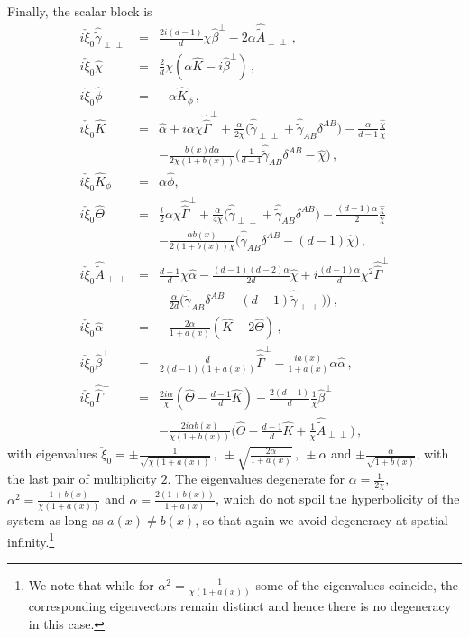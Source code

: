\documentclass[reprint,aps,amsmath,amssymb,twoside,prd,showkeys,superscriptaddress,nofootinbib]{revtex4-2}
\begin{document}
Finally, the scalar block is
\begin{subequations}\label{hyp_scalar}
\begin{eqnarray}
i\check{\xi}_0\hat{\tilde{\gamma}}_{\perp\perp} &=& \tfrac{2i(d-1)}{d}\chi\hat{\beta}^{\perp} - 2\alpha\hat{\tilde{A}}_{\perp\perp}\,,\\
i\check{\xi}_0\hat{\chi} &=& \tfrac{2}{d}\chi(\alpha\hat{K} - i\hat{\beta}^{\perp} )\,, \\
i\check{\xi}_0\hat{\phi} &=& -\alpha\hat{K}_{\phi}\,,\\
i\check{\xi}_0\hat{K} &=& \hat{\alpha}+i\alpha\chi\hat{\hat{\Gamma}}^{\perp}+\tfrac{\alpha}{2\chi}\big(\hat{\tilde{\gamma}}_{\perp\perp}+\hat{\tilde{\gamma}}_{AB}\delta^{AB}\big)-\tfrac{\alpha}{d-1}\tfrac{\hat{\chi}}{\chi}\nonumber\\&&-\tfrac{b(x)d\alpha}{2\chi(1+b(x))}\big(\tfrac{1}{d-1}\hat{\tilde{\gamma}}_{AB}\delta^{AB}-\hat{\chi}\big)\,, \\
i\check{\xi}_0\hat{K}_{\phi} &=& \alpha\hat{\phi}, \\
i\check{\xi}_0\hat{\Theta} &=& \tfrac{i}{2}\alpha\chi\hat{\hat{\Gamma}}^{\perp} +\tfrac{\alpha}{4\chi}\big(\hat{\tilde{\gamma}}_{\perp\perp}+\hat{\tilde{\gamma}}_{AB}\delta^{AB}\big)- \tfrac{(d-1)\alpha}{2}\tfrac{\hat{\chi}}{\chi}\nonumber\\&&-\tfrac{\alpha b(x)}{2(1+b(x))\chi}\big(\hat{\tilde{\gamma}}_{AB}\delta^{AB}-(d-1)\hat{\chi}\big)\,,\\
i\check{\xi}_0\hat{\tilde{A}}_{\perp\perp}&=&\tfrac{d-1}{d}\chi\hat{\alpha} - \tfrac{(d-1)(d-2)\alpha}{2d}\hat{\chi}+i\tfrac{(d-1)\alpha}{d}\chi^2\hat{\hat{\Gamma}}^{\perp}\nonumber\\&&  - \tfrac{\alpha}{2d}\big(\hat{\tilde{\gamma}}_{AB}\delta^{AB}-(d-1)\hat{\tilde{\gamma}}_{\perp\perp})\big)\,,\\
i\check{\xi}_0\hat{\alpha} &=& -\tfrac{2\alpha}{1+a(x)} (\hat{K}-2\hat{\Theta})\,,\\
i\check{\xi}_0\hat{\beta}^{\perp}&=&\tfrac{d}{2(d-1)(1+a(x))}\hat{\hat{\Gamma}}^{\perp}-\tfrac{ia(x)}{1+a(x)}\alpha \hat{\alpha}\,,\\
i\check{\xi}_0\hat{\hat{\Gamma}}^{\perp} &=& \tfrac{2i\alpha}{\chi}\left(\hat{\Theta}-\tfrac{d-1}{d}\hat{K}\right)-\tfrac{2(d-1)}{d}\tfrac{1}{\chi}\hat{\beta}^{\perp}\nonumber\\&& -\tfrac{2i\alpha b(x)}{\chi(1+b(x))}\big(\hat{\Theta}-\tfrac{d-1}{d}\hat{K}+\tfrac{1}{\chi}\hat{\tilde{A}}_{\perp\perp}\big)\,,
\end{eqnarray}
\end{subequations}
with eigenvalues $\check{\xi}_0 = \pm\tfrac{1}{\sqrt{\chi(1+a(x))}}\,,~\pm\sqrt{\tfrac{2\alpha}{1+a(x)}}\,,~\pm\alpha$ and $\pm\tfrac{\alpha}{\sqrt{1+b(x)}}$, with the last pair of multiplicity $2$. The eigenvalues degenerate for $\alpha=\frac{1}{2\chi}$, $\alpha^2=\frac{1+b(x)}{\chi(1+a(x))}$ and $\alpha=\frac{2(1+b(x))}{1+a(x)}$,  which do not spoil the hyperbolicity of the system as long as $a(x)\neq b(x)$, so that again we avoid degeneracy at spatial infinity.\footnote{We note that while for $\alpha^2=\frac{1}{\chi(1+a(x))}$ some of the eigenvalues coincide, the corresponding eigenvectors remain distinct and hence there is no degeneracy in this case.}
\end{document}
